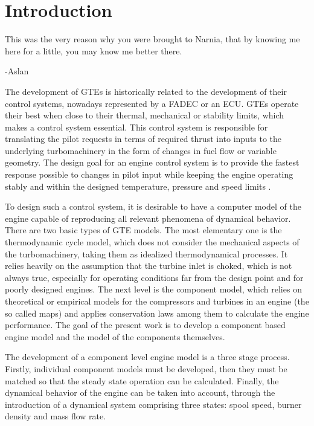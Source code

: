 \chapter{Introduction}
\label{ch:intro}
\epigraph{This was the very reason why you were brought to Narnia, that by knowing me here for a little, you may know me better there.}{-Aslan}

The development of \acp{GTE} is historically related to the development of their control systems, 
nowadays represented by a \ac{FADEC} or an \ac{ECU}. \Acp{GTE} operate their best when close to their
thermal, mechanical or stability limits, which makes a control system essential.
This control system is responsible for translating the pilot requests in terms of required thrust 
into inputs to the underlying turbomachinery 
in the form of changes in fuel flow or variable geometry.
The design goal for an engine control system is to provide the fastest response possible 
to changes in pilot input
while keeping the engine operating stably and within the designed temperature, pressure and speed limits
\cite{AustinSpangIII1999}.

To design such a control system, it is desirable to have a computer model of the engine 
capable of reproducing all relevant phenomena of dynamical behavior. 
There are two basic types of \ac{GTE} models. 
The most elementary one is the thermodynamic cycle model, which does not consider the mechanical aspects of the turbomachinery, taking them as idealized thermodynamical processes. It relies heavily on the assumption that the turbine inlet is choked, which is not always true, especially for operating conditions far from the design point and for poorly designed engines.
The next level is the component model, which relies on theoretical or empirical models for the compressors and turbines in an engine (the so called maps) and applies conservation laws among them to calculate the engine performance.
The goal of the present work is to develop a component based engine model 
and the model of the components themselves. 

The development of a component level engine model is a three stage process. 
Firstly, individual component models must be developed, 
then they must be matched so that the steady state operation can be calculated.
Finally, the dynamical behavior of the engine can be taken into account, 
through the introduction of a dynamical system comprising three states: 
spool speed, burner density and mass flow rate. 


